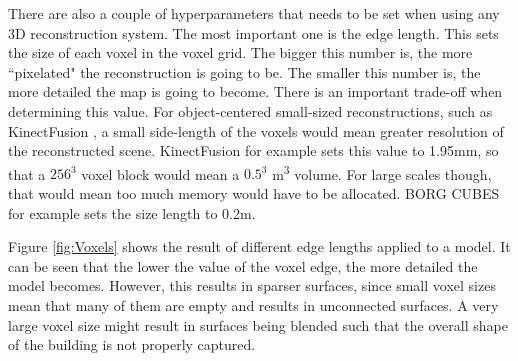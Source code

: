 \documentclass[11pt]{article}
\begin{document}
There are also a couple of hyperparameters that needs to be set when using any 3D reconstruction system. The most important one is the edge length. This sets the size of each voxel in the voxel grid. The bigger this number is, the more ``pixelated" the reconstruction is going to be. The smaller this number is, the more detailed the map is going to become. There is an important trade-off when determining this value. For object-centered small-sized reconstructions, such as KinectFusion \cite{kinectfusion}, a small side-length of the voxels would mean greater resolution of the reconstructed scene. KinectFusion for example sets this value to	 1.95mm, so that a $256^3$ voxel block would mean a $0.5^3$ m\textsuperscript{3} volume. For large scales though, that would mean too much memory would have to be allocated. BORG CUBES for example sets the size length to 0.2m.
	
Figure \ref{fig:Voxels} shows the result of different edge lengths applied to a model. It can be seen that the lower the value of the voxel edge, the more detailed the model becomes. However, this results in sparser surfaces, since small voxel sizes mean that many of them are empty and results in unconnected surfaces. A very large voxel size might result in surfaces being blended such that the overall shape of the building is not properly captured.
\end{document}
